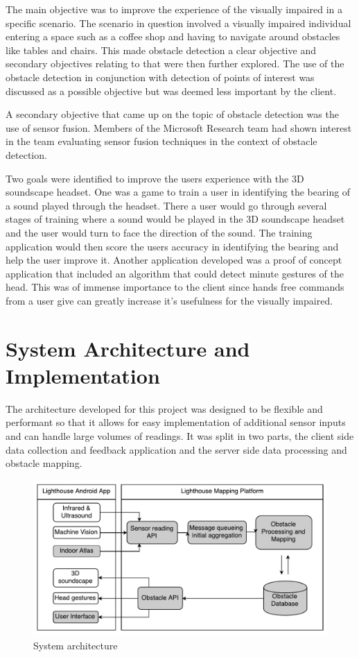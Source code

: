 \documentclass[prodmode,acmtosem]{acmsmall} %
\begin{document}
The main objective was to improve the experience of the visually impaired in a specific scenario. The scenario in question involved a visually impaired individual entering a space such as a coffee shop and having to navigate around obstacles like tables and chairs.
This made obstacle detection a clear objective and secondary objectives relating to that were then further explored. The use of the obstacle detection in conjunction with detection of points of interest was discussed as a possible objective but was deemed less important by the client.

A secondary objective that came up on the topic of obstacle detection was the use of sensor fusion. Members of the Microsoft Research team had shown interest in the team evaluating sensor fusion techniques in the context of obstacle detection.

Two goals were identified to improve the users experience with the 3D soundscape headset. One was a game to train a user in identifying the bearing of a sound played through the headset. There a user would go through several stages of training where a sound would be played in the 3D soundscape headset and the user would turn to face the direction of the sound. The training application would then score the users accuracy in identifying the bearing and help the user improve it.
Another application developed was a proof of concept application that included an algorithm that could detect minute gestures of the head. This was of immense importance to the client since hands free commands from a user give can greatly increase it's usefulness for the visually impaired.

\section{System Architecture and Implementation}
\label{sec:architecture}
The architecture developed for this project was designed to be flexible and performant so that it allows for easy implementation of additional sensor inputs and can handle large volumes of readings. It was split in two parts, the client side data collection and feedback application and the server side data processing and obstacle mapping.

\begin{figure}[!ht]
\label{fig:architecture}
\centering
\includegraphics[width=\textwidth]{ReportDiagram.pdf}
\caption{System architecture}
\end{figure}
\end{document}
